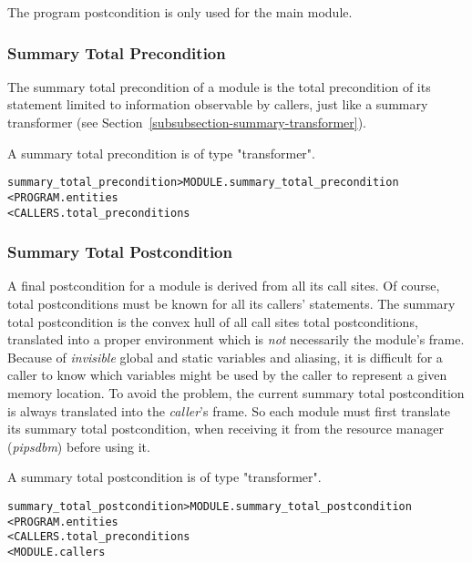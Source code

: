 \documentclass[a4paper]{report}
\newenvironment{PipsMake}{\begin{alltt}}{\end{alltt}}
\begin{document}
The program postcondition is only used for the main module.

\subsubsection{Summary Total Precondition}

The summary total precondition of a module is the total precondition of
its statement limited to information observable by callers, just like a
summary transformer (see Section~\ref{subsubsection-summary-transformer}).

A summary total precondition is of type "transformer".

\begin{PipsMake}
summary_total_precondition            > MODULE.summary_total_precondition
        < PROGRAM.entities
        < CALLERS.total_preconditions
\end{PipsMake}

\subsubsection{Summary Total Postcondition}

A final postcondition for a module is derived from all its call
sites. Of course, total postconditions must be known for all its callers'
statements.  The summary total postcondition is the convex hull of all call
sites total postconditions, translated into a proper environment which is {\em
not} necessarily the module's frame. Because of {\em invisible} global
and static variables and aliasing, it is difficult for a caller to know which
variables might be used by the caller to represent a given memory
location. To avoid the problem, the current summary total postcondition is
always translated into the {\em caller}'s frame. So each module must
first translate its summary total postcondition, when receiving it from the
resource manager ({\em pipsdbm}) before using it.

A summary total postcondition is of type "transformer".

\begin{PipsMake}
summary_total_postcondition            > MODULE.summary_total_postcondition
        < PROGRAM.entities
        < CALLERS.total_preconditions
        < MODULE.callers
\end{PipsMake}
\end{document}
